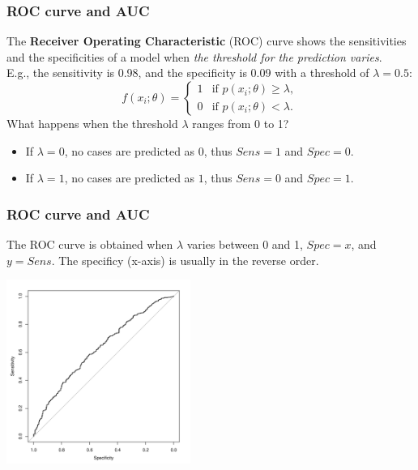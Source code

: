 \begin{frame}
\frametitle{ROC curve and AUC}
The {\bf Receiver Operating Characteristic} (ROC) curve shows the sensitivities and the specificities of a model when {\it the threshold for the prediction varies}.\\
\vspace{0.3cm}
E.g., the sensitivity is 0.98, and the specificity is 0.09 with a threshold of $\lambda=0.5$: 
$$
f(x_i;\theta)=
\left\{\begin{array}{ll}
1 & \mbox{if } p(x_i;\theta) \geq \lambda,\\
0& \mbox{if } p(x_i;\theta) < \lambda .
\end{array}
\right.
$$ 
What happens when the threshold $\lambda$ ranges from 0 to 1?
\begin{itemize}
\item If $\lambda=0$, no cases are predicted as $0$, thus $Sens=1$ and $Spec=0$.
\item If $\lambda=1$, no cases are predicted as $1$, thus $Sens=0$ and $Spec=1$.
\end{itemize}
\end{frame}
\begin{frame}
\frametitle{ROC curve and AUC}
The ROC curve is obtained when $\lambda$ varies between 0 and 1, $Spec=x$, and $y=Sens$. The specificy (x-axis) is usually in the reverse order.
\begin{center}
\includegraphics[width=6cm]{../Graphs/ROC_curve.pdf}
\end{center}
\end{frame}
